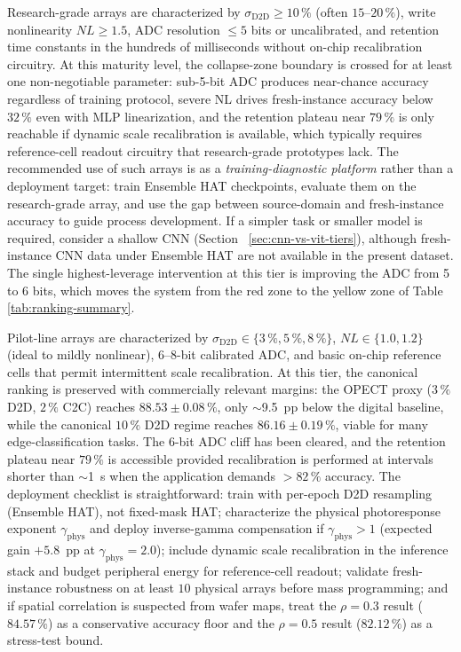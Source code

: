 Research-grade arrays are characterized by $\sigma_{\mathrm{D2D}} \ge 10\,\%$ (often $15$--$20\,\%$), write nonlinearity $NL \ge 1.5$, ADC resolution $\le 5$ bits or uncalibrated, and retention time constants in the hundreds of milliseconds without on-chip recalibration circuitry.  At this maturity level, the collapse-zone boundary is crossed for at least one non-negotiable parameter: sub-5-bit ADC produces near-chance accuracy regardless of training protocol, severe NL drives fresh-instance accuracy below $32\,\%$ even with MLP linearization, and the retention plateau near $79\,\%$ is only reachable if dynamic scale recalibration is available, which typically requires reference-cell readout circuitry that research-grade prototypes lack.  The recommended use of such arrays is as a \emph{training-diagnostic platform} rather than a deployment target: train Ensemble HAT checkpoints, evaluate them on the research-grade array, and use the gap between source-domain and fresh-instance accuracy to guide process development.  If a simpler task or smaller model is required, consider a shallow CNN (Section~
\ref{sec:cnn-vs-vit-tiers}), although fresh-instance CNN data under Ensemble HAT are not available in the present dataset.  The single highest-leverage intervention at this tier is improving the ADC from 5 to 6 bits, which moves the system from the red zone to the yellow zone of Table~
\ref{tab:ranking-summary}.

Pilot-line arrays are characterized by $\sigma_{\mathrm{D2D}} \in \{3\,\%, 5\,\%, 8\,\%\}$, $NL \in \{1.0, 1.2\}$ (ideal to mildly nonlinear), $6$--$8$-bit calibrated ADC, and basic on-chip reference cells that permit intermittent scale recalibration.  At this tier, the canonical ranking is preserved with commercially relevant margins: the OPECT proxy ($3\,\%$ D2D, $2\,\%$ C2C) reaches $88.53\pm0.08\,\%$, only $\sim$9.5~pp below the digital baseline, while the canonical $10\,\%$ D2D regime reaches $86.16\pm0.19\,\%$, viable for many edge-classification tasks.  The 6-bit ADC cliff has been cleared, and the retention plateau near $79\,\%$ is accessible provided recalibration is performed at intervals shorter than $\sim$1~s when the application demands $>82\,\%$ accuracy.  The deployment checklist is straightforward: train with per-epoch D2D resampling (Ensemble HAT), not fixed-mask HAT; characterize the physical photoresponse exponent $\gamma_{\mathrm{phys}}$ and deploy inverse-gamma compensation if $\gamma_{\mathrm{phys}} > 1$ (expected gain $+5.8$~pp at $\gamma_{\mathrm{phys}}=2.0$); include dynamic scale recalibration in the inference stack and budget peripheral energy for reference-cell readout; validate fresh-instance robustness on at least $10$ physical arrays before mass programming; and if spatial correlation is suspected from wafer maps, treat the $\rho=0.3$ result ($84.57\,\%$) as a conservative accuracy floor and the $\rho=0.5$ result ($82.12\,\%$) as a stress-test bound.

